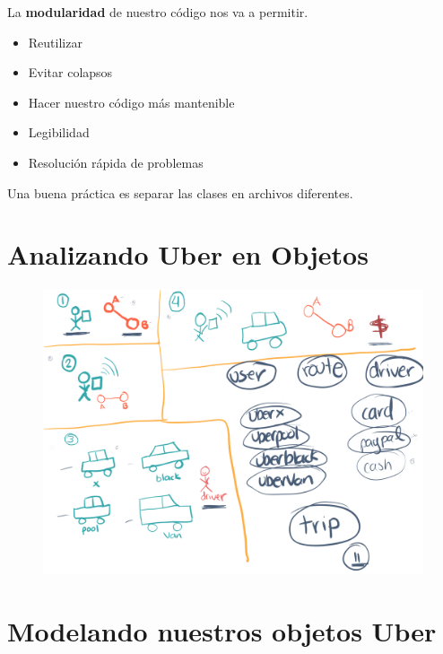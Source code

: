 \documentclass{article}
\begin{document}
La \textbf{modularidad} de nuestro código nos va a permitir.

\begin{itemize}
  \item Reutilizar
  \item Evitar colapsos
  \item Hacer nuestro código más mantenible
  \item Legibilidad
  \item Resolución rápida de problemas
\end{itemize}

Una buena práctica es separar las clases en archivos diferentes.

\newpage

\section{Analizando Uber en Objetos}%

\begin{figure}[h!]
  \centering
  \includegraphics[scale=0.08]{./Pictures/011_uber_objetos.png}
\end{figure}


\newpage


\section{Modelando nuestros objetos Uber}%
\end{document}

